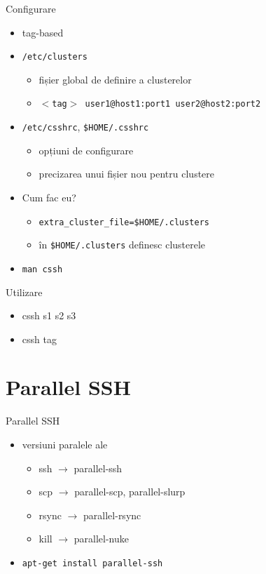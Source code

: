 \documentclass{beamer}
\begin{document}
\begin{frame}{Configurare}
	\begin{itemize}
		\item tag-based
		\item \texttt{/etc/clusters}
			\begin{itemize}
				\item fișier global de definire a clusterelor
				\item \texttt{$<$tag$>$ user1@host1:port1 user2@host2:port2}
			\end{itemize}
		\item \texttt{/etc/csshrc}, \texttt{\$HOME/.csshrc}
			\begin{itemize}
				\item opțiuni de configurare
				\item precizarea unui fișier nou pentru clustere
			\end{itemize}
		\item Cum fac eu?
			\begin{itemize}
				\item \texttt{extra\_cluster\_file=\$HOME/.clusters}
				\item în \texttt{\$HOME/.clusters} definesc clusterele
			\end{itemize}
		\item \texttt{man cssh}
	\end{itemize}
\end{frame}

\begin{frame}{Utilizare}
	\begin{itemize}
		\item cssh s1 s2 s3
		\item cssh tag
	\end{itemize}
\end{frame}

\section{Parallel SSH}

\frame{\tableofcontents[currentsection]}

\begin{frame}{Parallel SSH}
	\begin{itemize}
		\item versiuni paralele ale
			\begin{itemize}
				\item ssh $\rightarrow$ parallel-ssh
				\item scp $\rightarrow$ parallel-scp, parallel-slurp
				\item rsync $\rightarrow$ parallel-rsync
				\item kill $\rightarrow$ parallel-nuke
			\end{itemize}
		\item \texttt{apt-get install parallel-ssh}
	\end{itemize}
\end{frame}
\end{document}
